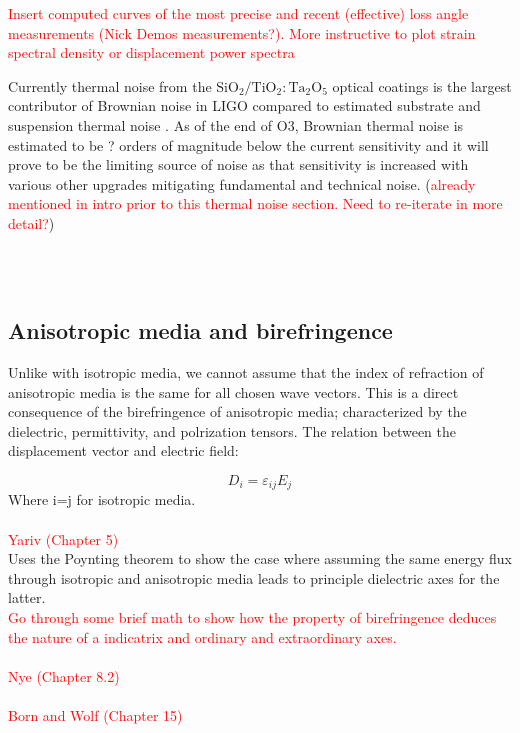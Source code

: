 \textcolor{red}{Insert computed curves of the most precise and recent (effective) loss angle measurements (Nick Demos measurements?). More instructive to plot strain spectral density or displacement power spectra}

\noindent Currently thermal noise from the $\mathrm{SiO_2}/\mathrm{TiO_2:Ta_2O_5}$ optical coatings is the largest contributor of Brownian noise in LIGO compared to estimated substrate and suspension thermal noise \cite{Harry:06}. As of the end of O3, Brownian thermal noise is estimated to be ? orders of magnitude below the current sensitivity and it will prove to be the limiting source of noise as that sensitivity is increased with various other upgrades mitigating fundamental and technical noise. (\textcolor{red}{already mentioned in intro prior to this thermal noise section. Need to re-iterate in more detail?})

 \\
 \\


\subsection{Anisotropic media and birefringence}
Unlike with isotropic media, we cannot assume that the index of refraction of anisotropic media is the same for all chosen wave vectors. This is a direct consequence of the birefringence of anisotropic media; characterized by the dielectric, permittivity, and polrization tensors. The relation between the displacement vector and electric field:

\begin{equation}
D_i = \varepsilon_{ij}E_j
\end{equation}
Where i=j for isotropic media.
\\
\\
\textcolor{red}{Yariv (Chapter 5)}
\\
Uses the Poynting theorem to show the case where assuming the same energy flux through isotropic and anisotropic media leads to principle dielectric axes for the latter.
\\
\textcolor{red}{Go through some brief math to show how the property of birefringence deduces the nature of a indicatrix and ordinary and extraordinary axes. }\cite{yariv, nye}
\\
\\
\textcolor{red}{Nye (Chapter 8.2)}
\\
\\
\textcolor{red}{Born and Wolf (Chapter 15)}
\\
